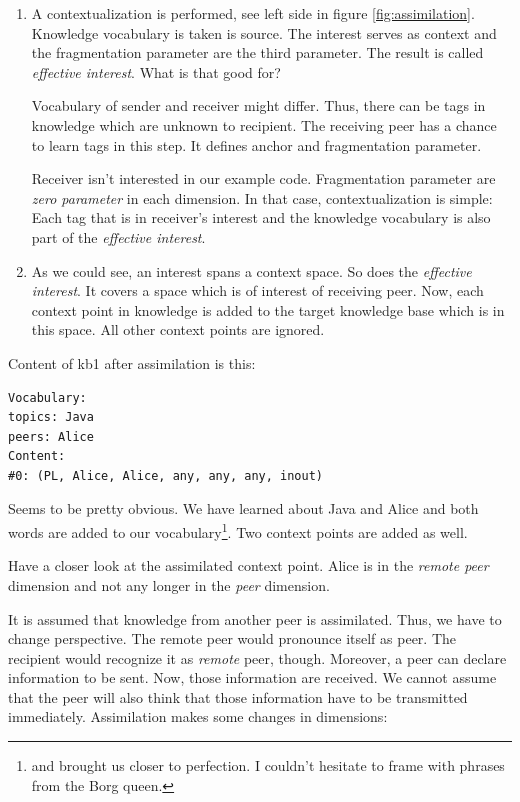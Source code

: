 \begin{enumerate}
\item 
A contextualization is performed, see left side in figure \ref{fig:assimilation}. Knowledge vocabulary is taken is source. The interest serves as context and the fragmentation parameter are the third parameter. The result is called {\it effective interest}. What is that good for?

Vocabulary of sender and receiver might differ. Thus, there can be tags in knowledge which are unknown to recipient. The receiving peer has a chance to learn tags in this step. It defines anchor and fragmentation parameter. 

Receiver isn't interested in our example code. Fragmentation parameter are {\it zero parameter} in each dimension. In that case, contextualization is simple: Each tag that is in receiver's interest and the knowledge vocabulary is also part of the {\it effective interest}.

\item 
As we could see, an interest spans a context space. So does the {\it effective interest}. It covers a space which is of interest of receiving peer. Now, each context point in knowledge is added to the target knowledge base which is in this space. All other context points are ignored.
\end{enumerate}

Content of kb1 after assimilation is this:

\begin{verbatim}
Vocabulary:
topics: Java
peers: Alice
Content:
#0: (PL, Alice, Alice, any, any, any, inout)
\end{verbatim}

Seems to be pretty obvious. We have learned about Java and Alice and both words are added to our vocabulary\footnote{and brought us closer to perfection. I couldn't hesitate to frame with phrases from the Borg queen.}. Two context points are added as well.

Have a closer look at the assimilated context point. Alice is in the {\it remote peer} dimension and not any longer in the {\it peer} dimension.

It is assumed that knowledge from another peer is assimilated. Thus, we have to change perspective. The remote peer would pronounce itself as peer. The recipient would recognize it as {\it remote} peer, though. Moreover, a peer can declare information to be sent. Now, those information are received. We cannot assume that the peer will also think that those information have to be transmitted immediately. Assimilation makes some changes in dimensions:

